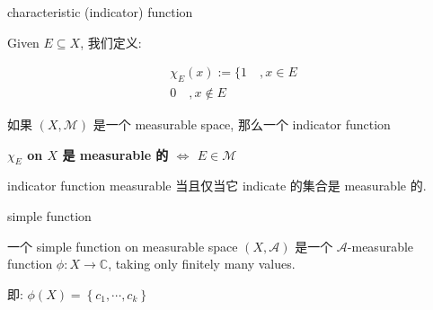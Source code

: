 \documentclass{qlnotes-export}
\begin{document}
\begin{definition}{characteristic (indicator) function}\label{def-04-measurable-functions-and-integration-on-l-mu-characteristic-indicator-function}

Given \(E \subseteq X\), 我们定义:

\[\begin{matrix}
{\chi_{E}(x) := \{ 1\quad,x \in E} \\
{0\quad,x \notin E}
\end{matrix}\]

\end{definition}

\begin{lemma}\label{lem-04-measurable-functions-and-integration-on-l-mu-lemma-003}

如果 \((X,\mathcal{M})\) 是一个 measurable space, 那么一个 indicator function

\textbf{\(\chi_{E}\) on \(X\) 是 measurable 的 \(\Leftrightarrow\) \(E \in \mathcal{M}\)}

\end{lemma}

indicator function measurable 当且仅当它 indicate 的集合是 measurable 的.

\begin{definition}{simple function}\label{def-04-measurable-functions-and-integration-on-l-mu-simple-function}

一个 simple function on measurable space \((X,\mathcal{A})\) 是一个 \(\mathcal{A}\)-measurable function \(\phi:X\rightarrow{\mathbb{C}}\), taking only finitely many values.

即: \(\phi(X) = \left\{ {c_{1},\cdots,c_{k}} \right\}\)

\end{definition}
\end{document}
